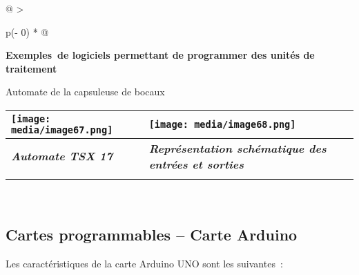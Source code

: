 \documentclass[
]{article}
\begin{document}
\begin{longtable}[]{@{}
  >{\raggedright\arraybackslash}p{(\columnwidth - 0\tabcolsep) * }@{}}
\toprule
\endhead
\begin{minipage}[t]{\linewidth}\raggedright
\textbf{Exemples~de logiciels permettant de programmer des unités de
traitement}

Automate de la capsuleuse de bocaux

\begin{longtable}[]{@{}ll@{}}
\toprule
\texttt{[image: media/image67.png]} &
\texttt{[image: media/image68.png]} \\
\midrule
\endhead
\emph{\textbf{Automate TSX 17}} & \emph{\textbf{Représentation
schématique des entrées et sorties}} \\
& \\
\bottomrule
\end{longtable}
\end{minipage} \\
\bottomrule
\end{longtable}

\hypertarget{cartes-programmables-carte-arduino}{%
\subsection{Cartes programmables -- Carte
Arduino}\label{cartes-programmables-carte-arduino}}

Les caractéristiques de la carte Arduino UNO sont les suivantes~:
\end{document}
